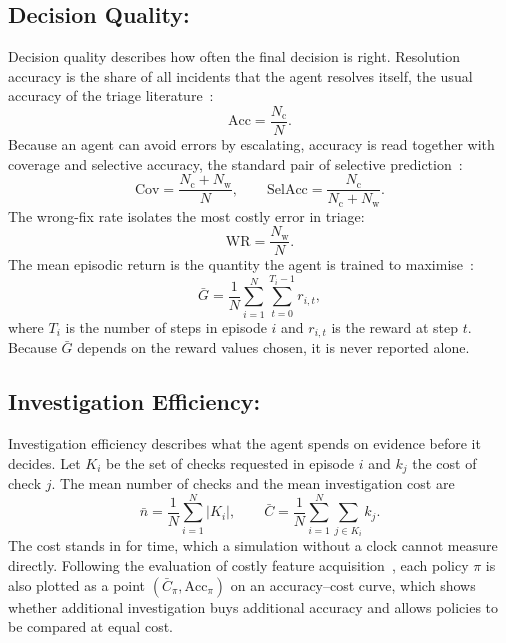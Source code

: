 \subsection{Decision Quality:}

Decision quality describes how often the final decision is right. Resolution accuracy is the share of all incidents that the agent resolves itself, the usual accuracy of the triage literature~\cite{remil2024}:
\begin{equation}
\text{Acc} = \frac{N_{\text{c}}}{N}.
\end{equation}
Because an agent can avoid errors by escalating, accuracy is read together with coverage and selective accuracy, the standard pair of selective prediction~\cite{geifman2019}:
\begin{equation}
\text{Cov} = \frac{N_{\text{c}} + N_{\text{w}}}{N}, \qquad
\text{SelAcc} = \frac{N_{\text{c}}}{N_{\text{c}} + N_{\text{w}}}.
\end{equation}
The wrong-fix rate isolates the most costly error in triage:
\begin{equation}
\text{WR} = \frac{N_{\text{w}}}{N}.
\end{equation}
The mean episodic return is the quantity the agent is trained to maximise~\cite{sutton2018}:
\begin{equation}
\bar{G} = \frac{1}{N}\sum_{i=1}^{N}\sum_{t=0}^{T_i-1} r_{i,t},
\end{equation}
where $T_i$ is the number of steps in episode $i$ and $r_{i,t}$ is the reward at step $t$. Because $\bar{G}$ depends on the reward values chosen, it is never reported alone.

\subsection{Investigation Efficiency:}

Investigation efficiency describes what the agent spends on evidence before it decides. Let $K_i$ be the set of checks requested in episode $i$ and $k_j$ the cost of check $j$. The mean number of checks and the mean investigation cost are
\begin{equation}
\bar{n} = \frac{1}{N}\sum_{i=1}^{N} |K_i|, \qquad
\bar{C} = \frac{1}{N}\sum_{i=1}^{N}\sum_{j \in K_i} k_j.
\end{equation}
The cost stands in for time, which a simulation without a clock cannot measure directly. Following the evaluation of costly feature acquisition~\cite{janisch2019}, each policy $\pi$ is also plotted as a point $(\bar{C}_\pi, \text{Acc}_\pi)$ on an accuracy--cost curve, which shows whether additional investigation buys additional accuracy and allows policies to be compared at equal cost.


